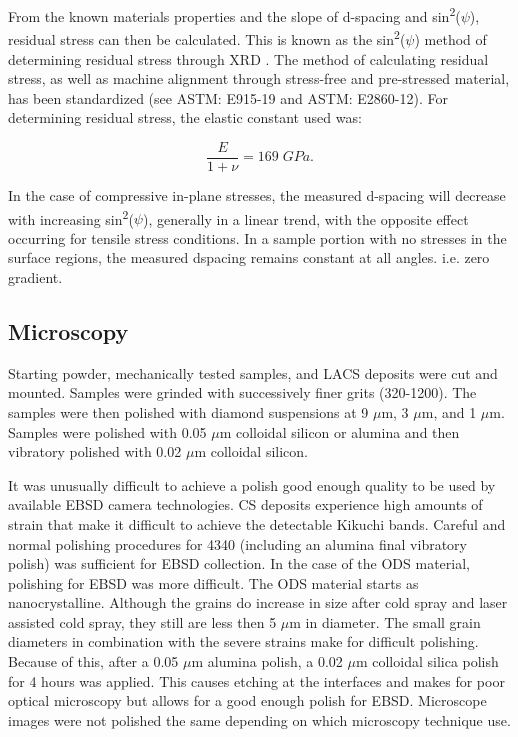 		
		
		From the known materials properties and the slope of d-spacing and sin\textsuperscript{2}($\psi$), residual stress can then be calculated. This is known as the sin\textsuperscript{2}($\psi$) method of determining residual stress through XRD \cite{RN1385}. The method of calculating residual stress, as well as machine alignment through stress-free and pre-stressed material, has been standardized (see ASTM: E915-19 and ASTM: E2860-12). For determining residual stress, the elastic constant used was: 
		
		
		\begin{equation}
			\frac{E}{1+ \nu }=169 \; GPa.
		\end{equation}
		
		In the case of compressive in-plane stresses, the measured d-spacing will decrease with increasing sin\textsuperscript{2}($\psi$), generally in a linear trend, with the opposite effect occurring for tensile stress conditions. In a sample portion with no stresses in the surface regions, the measured dspacing remains constant at all  angles. i.e. zero gradient.
		
	\subsection*{Microscopy}	
		
		Starting powder, mechanically tested samples, and LACS deposits were cut and mounted. Samples were grinded with successively finer grits (320-1200). The samples were then polished with diamond suspensions at 9 $ \mu$m, 3 $ \mu$m, and 1 $ \mu$m. Samples were polished with 0.05 $ \mu$m colloidal silicon or alumina and then vibratory polished with 0.02 $ \mu$m colloidal silicon.
		
		It was unusually difficult to achieve a polish good enough quality to be used by available EBSD camera technologies. CS deposits experience high amounts of strain that make it difficult to achieve the detectable Kikuchi bands. Careful and normal polishing procedures for 4340 (including an alumina final vibratory polish) was sufficient for EBSD collection. In the case of the ODS material, polishing for EBSD was more difficult. The ODS material starts as nanocrystalline. Although the grains do increase in size after cold spray and laser assisted cold spray, they still are less then 5 $ \mu$m in diameter. The small grain diameters in combination with the severe strains make for difficult polishing. Because of this, after a 0.05 $ \mu$m alumina polish, a 0.02 $ \mu$m colloidal silica polish for 4 hours was applied. This causes etching at the interfaces and makes for poor optical microscopy but allows for a good enough polish for EBSD. Microscope images were not polished the same depending on which microscopy technique use. 
		
